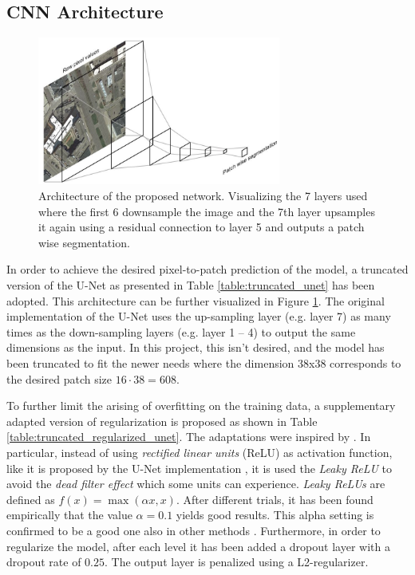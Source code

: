 \documentclass[10pt,conference,compsocconf]{IEEEtran}
\begin{document}
\subsection{CNN Architecture}\label{architectures}

\begin{figure}
\includegraphics[width={8cm}]{network-visualisation}
\caption{Architecture of the proposed network. Visualizing the 7 layers used where the first 6 downsample the image and the 7th layer upsamples it again using a residual connection to layer 5 and outputs a patch wise segmentation.}
\label{fig:architecture}
\end{figure}

In order to achieve the desired pixel-to-patch prediction of the model, a truncated version of the U-Net \cite{Ronneberger2015} as presented in Table \ref{table:truncated_unet} has been adopted. This architecture can be further visualized in Figure \ref{fig:architecture}. The original implementation of the U-Net uses the up-sampling layer (e.g. layer 7) as many times as the down-sampling layers (e.g. layer 1 – 4) to output the same dimensions as the input. In this project, this isn't desired, and the model has been truncated to fit the newer needs where the dimension 38x38 corresponds to the desired patch size $16 \cdot 38 = 608$.

To further limit the arising of overfitting on the training data, a supplementary adapted version of regularization is proposed as shown in Table \ref{table:truncated_regularized_unet}. The adaptations were inspired by \cite{Pavllo2017}. In particular, instead of using \textit{rectified linear units} (ReLU) as activation function, like it is proposed by the U-Net implementation \cite{Ronneberger2015}, it is used the \textit{Leaky ReLU} to avoid the \textit{dead filter effect} which some units can experience. \textit{Leaky ReLUs} are defined as $f(x) = \max(\alpha x, x)$. After different trials, it has been found empirically that the value $\alpha=0.1$ yields good results. This alpha setting is confirmed to be a good one also in other methods \cite{Pavllo2017}. Furthermore, in order to regularize the model, after each level it has been added a dropout layer with a dropout rate of $0.25$. The output layer is penalized using a L2-regularizer.
\end{document}
